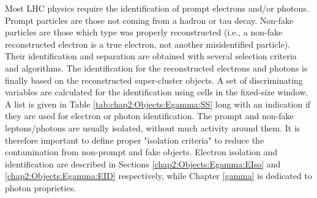 Most LHC physics require the identification of prompt electrons and/or photons. Prompt particles are those not coming from a hadron or tau decay. Non-fake particles are those which type was properly reconstructed (i.e., a non-fake reconstructed electron is a true electron, not another misidentified particle). Their identification and separation are obtained with several selection criteria and algorithms. The identification for the reconstructed electrons and photons is finally based on the reconstructed super-cluster objects. A set of discriminating variables are calculated for the identification using cells in the fixed-size window. A list is given in Table \ref{tab:chap2:Objects:Egamma:SS} long with an indication if they are used for electron or photon identification. The prompt and non-fake leptons/photons are usually isolated, without much activity around them. It is therefore important to define proper "isolation criteria" to reduce the contamination from non-prompt and fake objects. Electron isolation and identification are described in Sections \ref{chap2:Objects:Egamma:EIso} and \ref{chap2:Objects:Egamma:EID} respectively, while Chapter \ref{gamma} is dedicated to photon proprieties.
